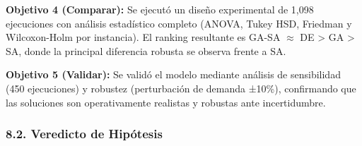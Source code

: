\documentclass[
  spanish,
  12pt,
]{article}
\begin{document}
\textbf{Objetivo 4 (Comparar):} Se ejecutó un diseño experimental de
1,098 ejecuciones con análisis estadístico completo (ANOVA, Tukey HSD,
Friedman y Wilcoxon-Holm por instancia). El ranking resultante es GA-SA
\(\approx\) DE \textgreater{} GA \textgreater{} SA, donde la principal
diferencia robusta se observa frente a SA.

\textbf{Objetivo 5 (Validar):} Se validó el modelo mediante análisis de
sensibilidad (450 ejecuciones) y robustez (perturbación de demanda
±10\%), confirmando que las soluciones son operativamente realistas y
robustas ante incertidumbre.

\subsubsection{8.2. Veredicto de
Hipótesis}\label{veredicto-de-hipuxf3tesis}
\end{document}
